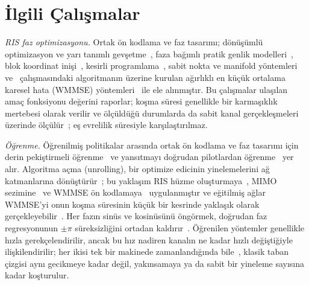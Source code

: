 \section{İlgili Çalışmalar}
\label{sec:related_work}

\emph{RIS faz optimizasyonu.} Ortak ön kodlama ve faz tasarımı; dönüşümlü optimizasyon ve yarı tanımlı gevşetme~\cite{Wu2019TWC}, faza bağımlı pratik genlik modelleri~\cite{Abeywickrama2020TCOM}, blok koordinat inişi~\cite{Pan2020TWC}, kesirli programlama~\cite{Guo2020TWC}, sabit nokta ve manifold yöntemleri~\cite{Yu2019ICCC} ve~\cite{Shi2011TSP} çalışmasındaki algoritmanın üzerine kurulan ağırlıklı en küçük ortalama karesel hata (WMMSE) yöntemleri~\cite{Choi2024TCOM} ile ele alınmıştır. Bu çalışmalar ulaşılan amaç fonksiyonu değerini raporlar; koşma süresi genellikle bir karmaşıklık mertebesi olarak verilir ve ölçüldüğü durumlarda da sabit kanal gerçekleşmeleri üzerinde ölçülür~\cite{Abeywickrama2020TCOM,Yu2019ICCC,Shi2011TSP,Cao2022TWC}; eş evrelilik süresiyle karşılaştırılmaz.

\emph{Öğrenme.} Öğrenilmiş politikalar arasında ortak ön kodlama ve faz tasarımı için derin pekiştirmeli öğrenme~\cite{Huang2020JSAC} ve yansıtmayı doğrudan pilotlardan öğrenme~\cite{Jiang2021JSAC} yer alır. Algoritma açma (unrolling), bir optimize edicinin yinelemelerini ağ katmanlarına dönüştürür~\cite{Monga2021SPM}; bu yaklaşım RIS hüzme oluşturmaya~\cite{Liu2022TWC}, MIMO sezimine~\cite{Samuel2019TSP} ve WMMSE ön kodlamaya~\cite{Hu2021TWC,Pellaco2022OJCOMS} uygulanmıştır ve eğitilmiş ağlar WMMSE'yi onun koşma süresinin küçük bir kesrinde yaklaşık olarak gerçekleyebilir~\cite{Sun2018TSP}. Her fazın sinüs ve kosinüsünü öngörmek, doğrudan faz regresyonunun $\pm\pi$ süreksizliğini ortadan kaldırır~\cite{SavasciSen2026AISY}. Öğrenilen yöntemler genellikle hızla gerekçelendirilir, ancak bu hız nadiren kanalın ne kadar hızlı değiştiğiyle ilişkilendirilir; her ikisi tek bir makinede zamanlandığında bile~\cite{Samuel2019TSP,Sun2018TSP,Hu2021TWC,Liu2022TWC}, klasik taban çizgisi aynı gecikmeye kadar değil, yakınsamaya ya da sabit bir yineleme sayısına kadar koşturulur.

